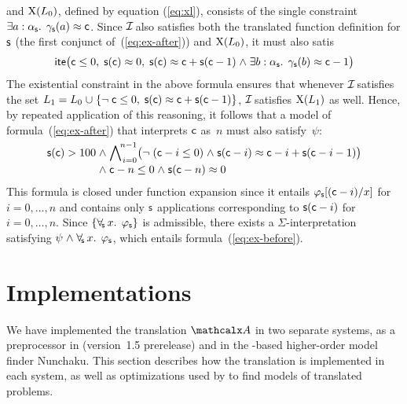 \begin{example}
and $\mathrm{X}( L_0 )$, defined by equation (\ref{eq:xl}), consists of the single constraint
$\exists a : {\alpha_{\mathsf{s}}}.\;\, \gamma_{\mathsf{s}}( a ) \approx \mathsf{c}$.
Since $\mathcal{I\!}$ also satisfies both the translated function definition for $\mathsf{s}$
(the first conjunct of~(\ref{eq:ex-after})) and $\mathrm{X}( L_0
)$, it must also satis
\[
\lite\bigl( \con{c} \leq 0,\;
            \con{s}(\con{c}) \teq 0,\;
            \con{s}(\con{c}) \teq \con{c} + \con{s}( \con{c}-1 )
            \wedge \exists b : {\fargtype{\con{s}}}.\;\, \farg{\con{s}}( b ) \teq \con{c}-1 \bigr)
\]
The existential constraint in the above formula
ensures that whenever $\mathcal{I\!}$ satisfies the set $L_1 = L_0 \cup \{ \neg \con{c} \leq 0,\; \con{s}(\con{c}) \teq \con{c} + \con{s}( \con{c}-1 ) \}$,
$\mathcal{I\!}$ satisfies $\mathrm{X}( L_1 )$ as well.
Hence, by repeated application of this reasoning, it follows that
a model of formula~(\ref{eq:ex-after}) that interprets $\mathsf{c}$ as~$n$ must also satisfy~$\psi$:
%
\[\begin{aligned}[t]
\con{s}( \con{c} ) > 100 %
& {} \wedge \relax{\bigwedge\nolimits_{\vthinspace i=0}^{\!\smash{n-1}}} \bigl( \neg (\con{c}-i \leq 0) \wedge \con{s}( \con{c}-i ) \teq \con{c}-i + \con{s}( \con{c}-i-1 ) \bigr) \\[-\jot]
& {} \wedge \con{c}-n \leq 0 \wedge \con{s}( \con{c}-n ) \teq 0
\end{aligned}\]
%
This formula is closed under function expansion
since it entails $\varphi_{\mathsf{s}}[(\mathsf{c}-i)/x]$ for $i = 0, \dotsc, n$
and contains only $\mathsf{s}$ applications corresponding to $\mathsf{s}( \mathsf{c}-i )$ for $i = 0, \dotsc, n$.
Since $\{\forall_{\!\mathsf{s}\:} x.\;\, \varphi_{\mathsf{s}}\}$ is admissible,
there exists a $\Sigma$-interpretation satisfying $\psi \wedge \forallf{\con{s}} x.\;\, \varphi_\con{s}$,
which entails formula~(\ref{eq:ex-before}).\xend
\end{example}

\section{Implementations}
\label{sec:implementations}

We have implemented the translation $\conv$ in two separate systems,
as a preprocessor in \cvc (version~1.5 prerelease)
and in the \cvc-based higher-order model finder Nunchaku.
This section describes how the translation is implemented in each system,
as well as optimizations used by \cvc to find models of translated
problems. %

